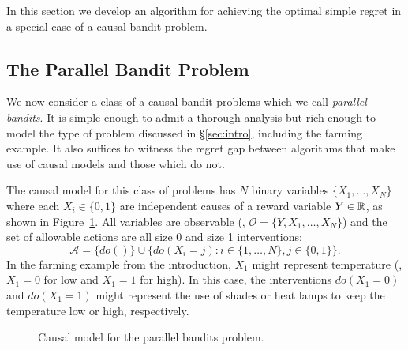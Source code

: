 In this section we develop an algorithm for achieving the optimal simple regret in a special case of a causal bandit problem.

\subsection{The Parallel Bandit Problem}

We now consider a class of a causal bandit problems which we call \emph{parallel bandits}.
It is simple enough to admit a thorough analysis but rich enough to model the type of problem discussed in \S\ref{sec:intro}, including the farming example. It also suffices to witness the regret gap between algorithms that make use of causal models and those which do not.

The causal model for this class of problems has $N$ binary variables $\{ X_1, \ldots, X_N \}$ where each $X_i \in \{0,1\}$ are independent causes of a reward variable $Y \in \mathbb R$, as shown in Figure~\ref{fig:causalStructure}.
All variables are observable (\ie, $\mathcal{O} = \{Y, X_1, \ldots, X_N\}$) and the set of allowable actions are all size 0 and size 1 interventions: 
\[
	\mathcal{A} = \{do()\} \cup \{ do(X_i = j) \colon i \in \{1, \ldots, N\}, j \in \{0,1\}\}.
\]
In the farming example from the introduction, $X_1$ might represent temperature (\eg, $X_1=0$ for low and $X_1=1$ for high). 
In this case, the interventions $do(X_1 = 0)$ and $do(X_1 = 1)$ might represent the use of shades or heat lamps to keep the temperature low or high, respectively.


\begin{figure}[h]
\centering
{}
\caption{Causal model for the parallel bandits problem.\label{fig:causalStructure}}
\end{figure}

